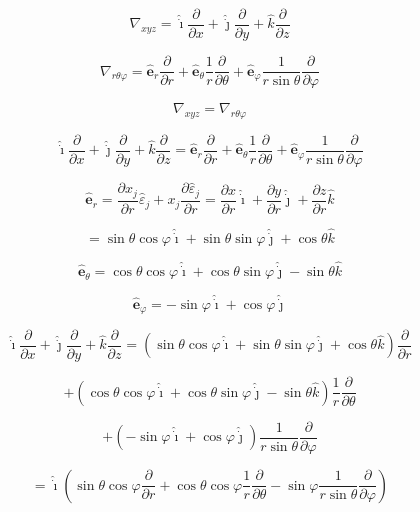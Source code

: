 \documentclass[12pt]{article}
\begin{document}
\[
    \nabla_{xyz} =  \hat{\dot{\imath}} \frac{\partial}{\partial x} + \hat{\dot{\jmath}} \frac{\partial}{\partial y} +  \hat{k} \frac{\partial}{\partial z}
\]

\[
    \nabla_{r \theta \varphi } = \hat{\textbf{e}}_r \frac{\partial}{\partial r} + \hat{\textbf{e}}_\theta \frac{1}{r} \frac{\partial}{\partial \theta} + \hat{\textbf{e}}_\varphi \frac{1}{r \sin{\theta}} \frac{\partial}{\partial \varphi}
\]

\[
    \nabla_{xyz} = \nabla_{r \theta \varphi }
\]

\[
    \hat{\dot{\imath}} \frac{\partial}{\partial x} + \hat{\dot{\jmath}} \frac{\partial}{\partial y} +  \hat{k} \frac{\partial}{\partial z} = \hat{\textbf{e}}_r \frac{\partial}{\partial r} + \hat{\textbf{e}}_\theta \frac{1}{r} \frac{\partial}{\partial \theta} + \hat{\textbf{e}}_\varphi \frac{1}{r \sin{\theta}} \frac{\partial}{\partial \varphi}
\]

\[
    \hat{\textbf{e}}_r = \frac{\partial x_j}{\partial r} \hat{\varepsilon}_j + x_j \frac{\partial \hat{\varepsilon}_j}{\partial r} = \frac{\partial x}{\partial r} \hat{\dot{\imath}} + \frac{\partial y}{\partial r} \hat{\dot{\jmath}} + \frac{\partial z}{\partial r} \hat{k}
\]

\[
    = \sin{\theta} \cos{\varphi} \hat{\dot{\imath}} + \sin{\theta} \sin{\varphi} \hat{\dot{\jmath}} + \cos{\theta} \hat{k}
\]

\[
    \hat{\textbf{e}}_\theta = \cos{\theta} \cos{\varphi} \hat{\dot{\imath}} + \cos{\theta} \sin{\varphi} \hat{\dot{\jmath}} - \sin{\theta} \hat{k}
\]

\[
    \hat{\textbf{e}}_\varphi = -\sin{\varphi} \hat{\dot{\imath}} + \cos{\varphi} \hat{\dot{\jmath}}
\]

\[
    \hat{\dot{\imath}} \frac{\partial}{\partial x} + \hat{\dot{\jmath}} \frac{\partial}{\partial y} +  \hat{k} \frac{\partial}{\partial z} = \left(\sin{\theta} \cos{\varphi} \hat{\dot{\imath}} + \sin{\theta} \sin{\varphi} \hat{\dot{\jmath}} + \cos{\theta} \hat{k}\right)  \frac{\partial}{\partial r}
\]

\[
    + \left(\cos{\theta} \cos{\varphi} \hat{\dot{\imath}} + \cos{\theta} \sin{\varphi} \hat{\dot{\jmath}} - \sin{\theta} \hat{k}\right) \frac{1}{r} \frac{\partial}{\partial \theta}
\]

\[
    + \left(-\sin{\varphi} \hat{\dot{\imath}} + \cos{\varphi} \hat{\dot{\jmath}}\right) \frac{1}{r \sin{\theta}} \frac{\partial}{\partial \varphi}
\]

\[
    = \hat{\dot{\imath}} \left(\sin{\theta} \cos{\varphi} \frac{\partial}{\partial r} + \cos{\theta} \cos{\varphi} \frac{1}{r} \frac{\partial}{\partial \theta} - \sin{\varphi} \frac{1}{r \sin{\theta}} \frac{\partial}{\partial \varphi} \right)
\]
\end{document}
